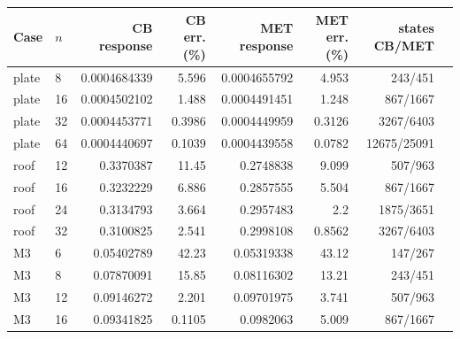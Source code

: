 \begin{tabular}{llrrrrrr}
\toprule
Case & $n$ & CB response & CB err. (\%) & MET response & MET err. (\%) & states CB/MET \\
\midrule
plate & 8 & 0.0004684339 & 5.596 & 0.0004655792 & 4.953 & 243/451 \\
plate & 16 & 0.0004502102 & 1.488 & 0.0004491451 & 1.248 & 867/1667 \\
plate & 32 & 0.0004453771 & 0.3986 & 0.0004449959 & 0.3126 & 3267/6403 \\
plate & 64 & 0.0004440697 & 0.1039 & 0.0004439558 & 0.0782 & 12675/25091 \\
roof & 12 & 0.3370387 & 11.45 & 0.2748838 & 9.099 & 507/963 \\
roof & 16 & 0.3232229 & 6.886 & 0.2857555 & 5.504 & 867/1667 \\
roof & 24 & 0.3134793 & 3.664 & 0.2957483 & 2.2 & 1875/3651 \\
roof & 32 & 0.3100825 & 2.541 & 0.2998108 & 0.8562 & 3267/6403 \\
M3 & 6 & 0.05402789 & 42.23 & 0.05319338 & 43.12 & 147/267 \\
M3 & 8 & 0.07870091 & 15.85 & 0.08116302 & 13.21 & 243/451 \\
M3 & 12 & 0.09146272 & 2.201 & 0.09701975 & 3.741 & 507/963 \\
M3 & 16 & 0.09341825 & 0.1105 & 0.0982063 & 5.009 & 867/1667 \\
\bottomrule
\end{tabular}
